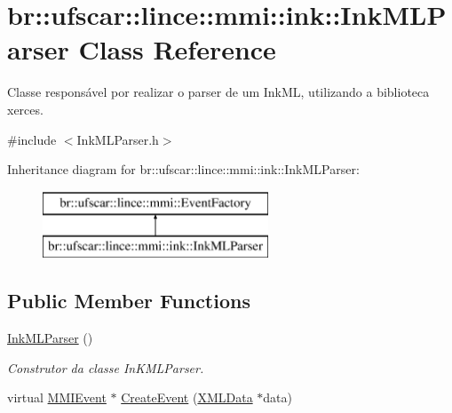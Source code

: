 \hypertarget{classbr_1_1ufscar_1_1lince_1_1mmi_1_1ink_1_1InkMLParser}{
\section{br::ufscar::lince::mmi::ink::InkMLParser Class Reference}
\label{classbr_1_1ufscar_1_1lince_1_1mmi_1_1ink_1_1InkMLParser}
}


Classe responsável por realizar o parser de um InkML, utilizando a biblioteca xerces.  




{\ttfamily \#include $<$InkMLParser.h$>$}

Inheritance diagram for br::ufscar::lince::mmi::ink::InkMLParser:\begin{figure}[H]
\begin{center}
\leavevmode
\includegraphics[height=2cm]{classbr_1_1ufscar_1_1lince_1_1mmi_1_1ink_1_1InkMLParser}
\end{center}
\end{figure}
\subsection*{Public Member Functions}
\begin{DoxyCompactItemize}
\item 
\hyperlink{classbr_1_1ufscar_1_1lince_1_1mmi_1_1ink_1_1InkMLParser_a53b502493d849cc8244d5a831c0afe13}{InkMLParser} ()
\begin{DoxyCompactList}\small\item\em Construtor da classe InKMLParser. \item\end{DoxyCompactList}\item 
virtual \hyperlink{classbr_1_1ufscar_1_1lince_1_1mmi_1_1MMIEvent}{MMIEvent} $\ast$ \hyperlink{classbr_1_1ufscar_1_1lince_1_1mmi_1_1ink_1_1InkMLParser_aeb533c915bd5909319e3195f14993afa}{CreateEvent} (\hyperlink{structbr_1_1ufscar_1_1lince_1_1mmi_1_1XMLData}{XMLData} $\ast$data)
\end{DoxyCompactItemize}
